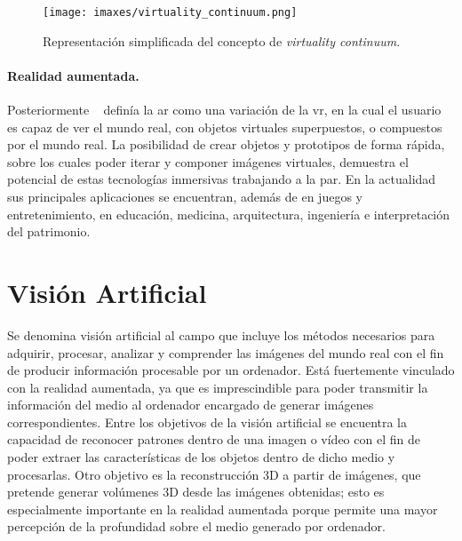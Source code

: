 \begin{figure}
	\centering
	\texttt{[image: imaxes/virtuality\_continuum.png]}
	\caption{Representación simplificada del concepto de \emph{virtuality continuum}.}
	\label{fig:vc}
\end{figure}

\paragraph{Realidad aumentada.}
Posteriormente \citeauthor{Azuma1997}~\cite{Azuma1997} definía la \acrlong{ar} como una variación de la \acrlong{vr}, en la cual el usuario es capaz de ver el mundo real, con objetos virtuales superpuestos, o compuestos por el mundo real. La posibilidad de crear objetos y prototipos de forma rápida, sobre los cuales poder iterar y componer imágenes virtuales, demuestra el potencial de estas tecnologías inmersivas trabajando a la par. En la actualidad sus principales aplicaciones se encuentran, además de en juegos y entretenimiento, en educación, medicina, arquitectura, ingeniería e interpretación del patrimonio.


\section{Visión Artificial}

Se denomina visión artificial al campo que incluye los métodos necesarios para adquirir, procesar, analizar y comprender las imágenes del mundo real con el fin de producir información procesable por un ordenador. Está fuertemente vinculado con la realidad aumentada, ya que es imprescindible para poder transmitir la información del medio al ordenador encargado de generar imágenes correspondientes.
Entre los objetivos de la visión artificial se encuentra la capacidad de reconocer patrones dentro de una imagen o vídeo con el fin de poder extraer las características de los objetos dentro de dicho medio y procesarlas.
Otro objetivo es la reconstrucción 3D a partir de imágenes, que pretende generar volúmenes 3D desde las imágenes obtenidas; esto es especialmente importante en la realidad aumentada porque permite una mayor percepción de la profundidad sobre el medio generado por ordenador.